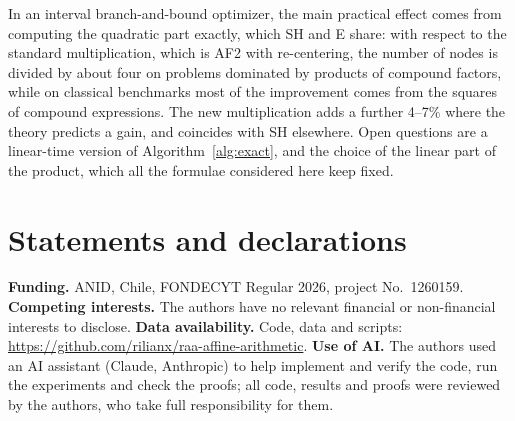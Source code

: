 \documentclass[10pt]{article}
\theoremstyle{definition}
\begin{document}
In an interval branch-and-bound optimizer, the main practical effect comes from computing the quadratic part exactly, which SH and E share: with respect to the standard multiplication, which is AF2 with re-centering, the number of nodes is divided by about four on problems dominated by products of compound factors, while on classical benchmarks most of the improvement comes from the squares of compound expressions. The new multiplication adds a further 4--7\% where the theory predicts a gain, and coincides with SH elsewhere. Open questions are a linear-time version of Algorithm~\ref{alg:exact}, and the choice of the linear part of the product, which all the formulae considered here keep fixed.

\section*{Statements and declarations}
\textbf{Funding.} ANID, Chile, FONDECYT Regular 2026, project No.~1260159.
\textbf{Competing interests.} The authors have no relevant financial or non-financial interests to disclose.
\textbf{Data availability.} Code, data and scripts: \url{https://github.com/rilianx/raa-affine-arithmetic}.
\textbf{Use of AI.} The authors used an AI assistant (Claude, Anthropic) to help implement and verify the code, run the experiments and check the proofs; all code, results and proofs were reviewed by the authors, who take full responsibility for them.



\end{document}

